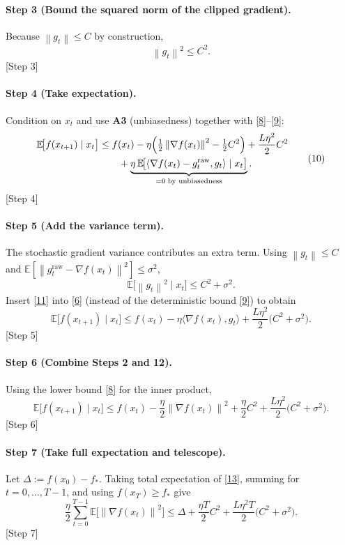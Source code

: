 \documentclass{article}
\newcommand{\norm}[1]{\left\lVert#1\right\rVert}
\newcommand{\E}{\mathbb{E}}
\begin{document}
\paragraph{Step 3 (Bound the squared norm of the clipped gradient).}
Because $\norm{g_t}\le C$ by construction,
\[
\norm{g_t}^{2}\le C^{2}.
\tag{9}
\]
[Step 3]

\paragraph{Step 4 (Take expectation).}
Condition on $x_t$ and use \textbf{A3} (unbiasedness) together with
\eqref{8}–\eqref{9}:
\[
\begin{aligned}
\E\!\bigl[f(x_{t+1})\mid x_t\bigr]
&\le f(x_t)
-\eta\Bigl(\tfrac12\norm{\nabla f(x_t)}^{2}-\tfrac12 C^{2}\Bigr)
+\frac{L\eta^{2}}{2}C^{2}\\
&\qquad
+\underbrace{\eta\,\E\!\bigl[\langle\nabla f(x_t)-g^{\text{raw}}_t,g_t\rangle\mid x_t\bigr]}_{=0\;\text{by unbiasedness}} .
\end{aligned}
\tag{10}
\]
[Step 4]

\paragraph{Step 5 (Add the variance term).}
The stochastic gradient variance contributes an extra term.
Using $\norm{g_t}\le C$ and $\E[\norm{g^{\text{raw}}_t-\nabla f(x_t)}^{2}]\le\sigma^{2}$,
\[
\E\!\bigl[\norm{g_t}^{2}\mid x_t\bigr]
\le C^{2}+\sigma^{2}.
\tag{11}
\]
Insert \eqref{11} into \eqref{6} (instead of the deterministic bound \eqref{9}) to obtain
\[
\E\!\bigl[f(x_{t+1})\mid x_t\bigr]
\le f(x_t)-\eta\langle\nabla f(x_t),g_t\rangle
+\frac{L\eta^{2}}{2}\bigl(C^{2}+\sigma^{2}\bigr).
\tag{12}
\]
[Step 5]

\paragraph{Step 6 (Combine Steps 2 and 12).}
Using the lower bound \eqref{8} for the inner product,
\[
\E\!\bigl[f(x_{t+1})\mid x_t\bigr]
\le f(x_t)
-\frac{\eta}{2}\norm{\nabla f(x_t)}^{2}
+\frac{\eta}{2}C^{2}
+\frac{L\eta^{2}}{2}\bigl(C^{2}+\sigma^{2}\bigr).
\tag{13}
\]
[Step 6]

\paragraph{Step 7 (Take full expectation and telescope).}
Let $\Delta:=f(x_0)-f_*$.  Taking total expectation of \eqref{13},
summing for $t=0,\dots,T-1$, and using $f(x_T)\ge f_*$ give
\[
\frac{\eta}{2}\sum_{t=0}^{T-1}\E\!\bigl[\norm{\nabla f(x_t)}^{2}\bigr]
\le \Delta
+ \frac{\eta T}{2}C^{2}
+ \frac{L\eta^{2}T}{2}\bigl(C^{2}+\sigma^{2}\bigr).
\tag{14}
\]
[Step 7]
\end{document}
